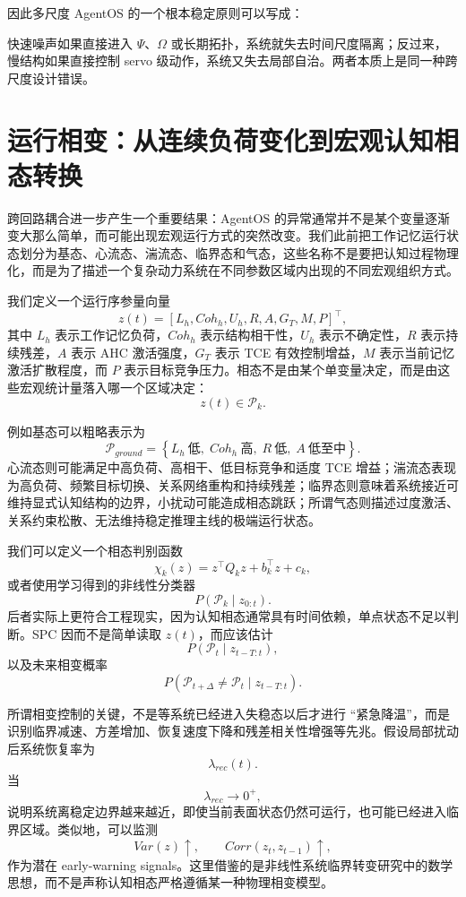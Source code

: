 因此多尺度 AgentOS 的一个根本稳定原则可以写成：
\begin{statementbox}
\centering
{}
\end{statementbox}
快速噪声如果直接进入 $\Psi$、$\Omega$ 或长期拓扑，系统就失去时间尺度隔离；反过来，慢结构如果直接控制 servo 级动作，系统又失去局部自治。两者本质上是同一种跨尺度设计错误。

\section{运行相变：从连续负荷变化到宏观认知相态转换}

跨回路耦合进一步产生一个重要结果：AgentOS 的异常通常并不是某个变量逐渐变大那么简单，而可能出现宏观运行方式的突然改变。我们此前把工作记忆运行状态划分为基态、心流态、湍流态、临界态和气态，这些名称不是要把认知过程物理化，而是为了描述一个复杂动力系统在不同参数区域内出现的不同宏观组织方式。

我们定义一个运行序参量向量
\[
z(t)
=
\left[
L_h,
Coh_h,
U_h,
R,
A,
G_T,
M,
P
\right]^{\top},
\]
其中 $L_h$ 表示工作记忆负荷，$Coh_h$ 表示结构相干性，$U_h$ 表示不确定性，$R$ 表示持续残差，$A$ 表示 AHC 激活强度，$G_T$ 表示 TCE 有效控制增益，$M$ 表示当前记忆激活扩散程度，而 $P$ 表示目标竞争压力。相态不是由某个单变量决定，而是由这些宏观统计量落入哪一个区域决定：
\[
z(t)\in\mathcal P_k.
\]

例如基态可以粗略表示为
\[
\mathcal P_{ground}
=
\left\{
L_h\ \text{低},
\;
Coh_h\ \text{高},
\;
R\ \text{低},
\;
A\ \text{低至中}
\right\}.
\]
心流态则可能满足中高负荷、高相干、低目标竞争和适度 TCE 增益；湍流态表现为高负荷、频繁目标切换、关系网络重构和持续残差；临界态则意味着系统接近可维持显式认知结构的边界，小扰动可能造成相态跳跃；所谓气态则描述过度激活、关系约束松散、无法维持稳定推理主线的极端运行状态。

我们可以定义一个相态判别函数
\[
\chi_k(z)
=
z^\top Q_k z+b_k^\top z+c_k,
\]
或者使用学习得到的非线性分类器
\[
P(\mathcal P_k\mid z_{0:t}).
\]
后者实际上更符合工程现实，因为认知相态通常具有时间依赖，单点状态不足以判断。SPC 因而不是简单读取 $z(t)$，而应该估计
\[
P
\left(
\mathcal P_t
\mid
z_{t-T:t}
\right),
\]
以及未来相变概率
\[
P
\left(
\mathcal P_{t+\Delta}
\neq
\mathcal P_t
\mid
z_{t-T:t}
\right).
\]

所谓相变控制的关键，不是等系统已经进入失稳态以后才进行 ``紧急降温''，而是识别临界减速、方差增加、恢复速度下降和残差相关性增强等先兆。假设局部扰动后系统恢复率为
\[
\lambda_{rec}(t).
\]
当
\[
\lambda_{rec}\rightarrow0^{+},
\]
说明系统离稳定边界越来越近，即使当前表面状态仍然可运行，也可能已经进入临界区域。类似地，可以监测
\[
Var(z)\uparrow,
\qquad
Corr(z_t,z_{t-1})\uparrow,
\]
作为潜在 early-warning signals。这里借鉴的是非线性系统临界转变研究中的数学思想，而不是声称认知相态严格遵循某一种物理相变模型。

